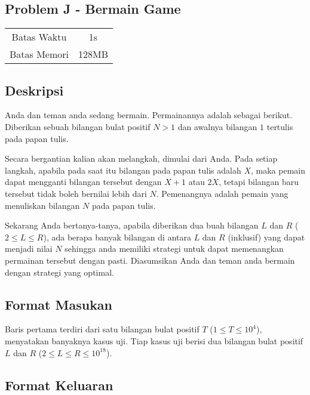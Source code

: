 \documentclass{article}
\begin{document}
\begin{center}
    \section*{Problem J - Bermain Game} %

    \begin{tabular}{ | c c | }
        \hline
        Batas Waktu  & 1s \\    %
        Batas Memori & 128MB \\  %
        \hline
    \end{tabular}
\end{center}

\subsection*{Deskripsi}

Anda dan teman anda sedang bermain. Permainannya adalah sebagai berikut. Diberikan sebuah bilangan bulat positif $N > 1$ dan awalnya bilangan $1$ tertulis pada papan tulis.

Secara bergantian kalian akan melangkah, dimulai dari Anda. Pada setiap langkah, apabila pada saat itu bilangan pada papan tulis adalah $X$, maka pemain dapat mengganti bilangan tersebut dengan $X + 1$ atau $2X$, tetapi bilangan baru tersebut tidak boleh bernilai lebih dari $N$. Pemenangnya adalah pemain yang menuliskan bilangan $N$ pada papan tulis.

Sekarang Anda bertanya-tanya, apabila diberikan dua buah bilangan $L$ dan $R$ ($2 \le L \le R$), ada berapa banyak bilangan di antara $L$ dan $R$ (inklusif) yang dapat menjadi nilai $N$ sehingga anda memiliki strategi untuk dapat memenangkan permainan tersebut dengan pasti. Diasumsikan Anda dan teman anda bermain dengan strategi yang optimal.

\subsection*{Format Masukan}

Baris pertama terdiri dari satu bilangan bulat positif $T$ ($1 \leq T \leq 10^4$), menyatakan banyaknya kasus uji.
Tiap kasus uji berisi dua bilangan bulat positif $L$ dan $R$ ($2 \leq L \leq R \leq 10^{18}$).

\subsection*{Format Keluaran}
\end{document}
